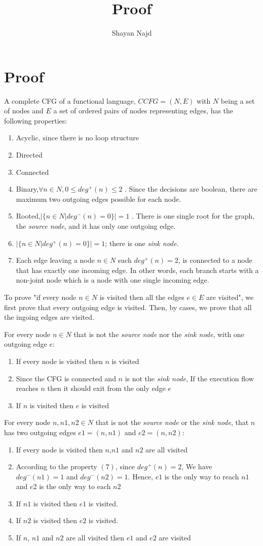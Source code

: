 \documentclass[a4paper,10pt]{article}
\title{Proof}
\author{Shayan Najd}
\begin{document}
\section{Proof}
A complete CFG of a functional language, $CCFG = (N,E)$ with $N$ being a set of nodes and $E$ a set of ordered pairs of nodes representing edges, has the following properties:

\begin{enumerate}
 \item Acyclic, since there is no loop structure
 \item Directed
 \item Connected
 \item Binary,$\forall n \in N, 0\leq deg^+(n)\leq2 $ . Since the decisions are boolean, there are maximum two outgoing edges possible for each node.
 \item Rooted,$|\{n\in N |deg^-(n)=0\} | = 1$ . There is one single root for the graph, the \emph{source node}, and it has only one outgoing edge.
 \item $|\{n\in N |deg^+(n)=0\} | = 1$; there is one \emph{sink node}.
 \item Each edge leaving a node $n \in N$ such $deg^+(n)=2$, is connected to a node that has exactly one incoming edge. In other words, each branch starts with a non-joint node which is a node with one single incoming edge.
\end{enumerate}

To prove "if every node $n \in N$ is visited then all the edges $e \in E$ are visited", we first prove that every outgoing edge is visited. Then, by cases, we prove that all the ingoing edges are visited.

For every node $n \in N$ that is not the \emph{source node} nor the \emph{sink node}, with one outgoing edge $e$:
\begin{enumerate}
 \item If every node is visited then $n$ is visited 
 \item Since the CFG is connected and $n$ is not the \emph{sink node}, If the execution flow reaches $n$ then it should exit from the only edge $e$
 \item If $n$ is visited then $e$ is visited
\end{enumerate}

For every node $n,n1,n2 \in N$ that is not the \emph{source node} or the \emph{sink node}, that $n$ has two outgoing edges $e1=(n,n1)$ and $e2=(n,n2)$:
\begin{enumerate}
 \item If every node is visited then $n$,$n1$ and $n2$ are all visited 
 \item According to the property $(7)$, since $deg^+(n)=2$, We have $deg^-(n1)=1$ and $deg^-(n2)=1$. Hence, $e1$ is the only way to reach $n1$ and $e2$ is the only way to each $n2$
 \item If $n1$ is visited then $e1$ is visited.
 \item If $n2$ is visited then $e2$ is visited.
 \item If $n$, $n1$ and $n2$ are all visited then $e1$ and $e2$ are visited
\end{enumerate}
\end{document}
